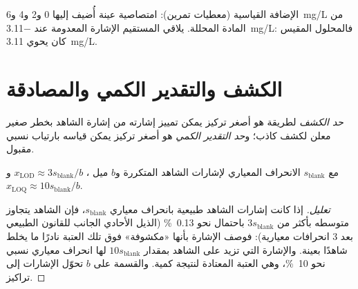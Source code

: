 \begin{omfigure}

{\small الإضافة القياسية (معطيات تمرين): امتصاصية عينة أُضيف إليها 0 و2 و4 
و\qty{6}{mg/L} من المادة المحللة. يلاقي المستقيم الإشارة المعدومة عند \qty{-3.11}{mg/L}: فالمحلول المقيس
كان يحوي \qty{3.11}{mg/L}.}
\end{omfigure}

\section{الكشف والتقدير الكمي والمصادقة}

\begin{definition}[الحدود]\label{def:b2:measurement-statistics:limits}
\emph{حد الكشف} لطريقة هو أصغر تركيز يمكن تمييز إشارته
من إشارة الشاهد بخطر صغير معلن لكشف كاذب؛ 
و\emph{حد التقدير الكمي} هو أصغر تركيز يمكن
قياسه بارتياب نسبي مقبول.
\end{definition}

\begin{proposition}\label{prop:b2:measurement-statistics:lod}
مع $s_{\mathrm{blank}}$ الانحراف المعياري لإشارات الشاهد المتكررة و$b$ ميل
، $x_{\mathrm{LOD}} \approx 3s_{\mathrm{blank}}/b$ و$x_{\mathrm{LOQ}} \approx
10s_{\mathrm{blank}}/b$.
\end{proposition}

\begin{proof}[تعليل]
إذا كانت إشارات الشاهد طبيعية بانحراف معياري $s_{\mathrm{blank}}$، فإن الشاهد يتجاوز متوسطه
بأكثر من $3s_{\mathrm{blank}}$ باحتمال نحو 0.13~\% (الذيل الأحادي الجانب للقانون الطبيعي بعد
3 انحرافات معيارية): فوصف الإشارة بأنها «مكشوفة» فوق تلك العتبة نادرًا ما يخلط شاهدًا
بعينة. والإشارة التي تزيد على الشاهد بمقدار $10s_{\mathrm{blank}}$ لها انحراف معياري نسبي نحو
10~\%، وهي العتبة المعتادة لنتيجة كمية. والقسمة على $b$ تحوّل الإشارات إلى
تراكيز.
\end{proof}

